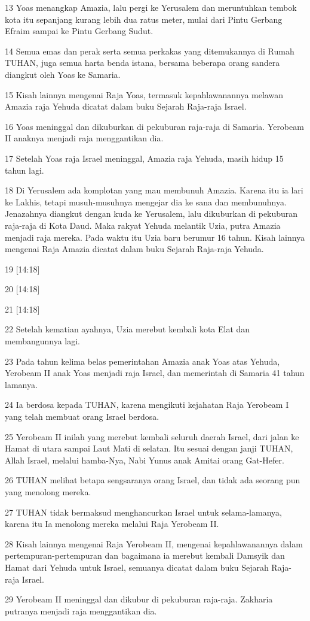 \par 13 Yoas menangkap Amazia, lalu pergi ke Yerusalem dan meruntuhkan tembok kota itu sepanjang kurang lebih dua ratus meter, mulai dari Pintu Gerbang Efraim sampai ke Pintu Gerbang Sudut.
\par 14 Semua emas dan perak serta semua perkakas yang ditemukannya di Rumah TUHAN, juga semua harta benda istana, bersama beberapa orang sandera diangkut oleh Yoas ke Samaria.
\par 15 Kisah lainnya mengenai Raja Yoas, termasuk kepahlawanannya melawan Amazia raja Yehuda dicatat dalam buku Sejarah Raja-raja Israel.
\par 16 Yoas meninggal dan dikuburkan di pekuburan raja-raja di Samaria. Yerobeam II anaknya menjadi raja menggantikan dia.
\par 17 Setelah Yoas raja Israel meninggal, Amazia raja Yehuda, masih hidup 15 tahun lagi.
\par 18 Di Yerusalem ada komplotan yang mau membunuh Amazia. Karena itu ia lari ke Lakhis, tetapi musuh-musuhnya mengejar dia ke sana dan membunuhnya. Jenazahnya diangkut dengan kuda ke Yerusalem, lalu dikuburkan di pekuburan raja-raja di Kota Daud. Maka rakyat Yehuda melantik Uzia, putra Amazia menjadi raja mereka. Pada waktu itu Uzia baru berumur 16 tahun. Kisah lainnya mengenai Raja Amazia dicatat dalam buku Sejarah Raja-raja Yehuda.
\par 19 [14:18]
\par 20 [14:18]
\par 21 [14:18]
\par 22 Setelah kematian ayahnya, Uzia merebut kembali kota Elat dan membangunnya lagi.
\par 23 Pada tahun kelima belas pemerintahan Amazia anak Yoas atas Yehuda, Yerobeam II anak Yoas menjadi raja Israel, dan memerintah di Samaria 41 tahun lamanya.
\par 24 Ia berdosa kepada TUHAN, karena mengikuti kejahatan Raja Yerobeam I yang telah membuat orang Israel berdosa.
\par 25 Yerobeam II inilah yang merebut kembali seluruh daerah Israel, dari jalan ke Hamat di utara sampai Laut Mati di selatan. Itu sesuai dengan janji TUHAN, Allah Israel, melalui hamba-Nya, Nabi Yunus anak Amitai orang Gat-Hefer.
\par 26 TUHAN melihat betapa sengsaranya orang Israel, dan tidak ada seorang pun yang menolong mereka.
\par 27 TUHAN tidak bermaksud menghancurkan Israel untuk selama-lamanya, karena itu Ia menolong mereka melalui Raja Yerobeam II.
\par 28 Kisah lainnya mengenai Raja Yerobeam II, mengenai kepahlawanannya dalam pertempuran-pertempuran dan bagaimana ia merebut kembali Damsyik dan Hamat dari Yehuda untuk Israel, semuanya dicatat dalam buku Sejarah Raja-raja Israel.
\par 29 Yerobeam II meninggal dan dikubur di pekuburan raja-raja. Zakharia putranya menjadi raja menggantikan dia.

